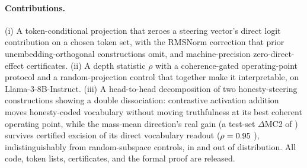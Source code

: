 \paragraph{Contributions.}
(i) A token-conditional projection that zeroes a steering vector's direct logit contribution on a chosen token set, with the RMSNorm correction that prior unembedding-orthogonal constructions omit, and machine-precision zero-direct-effect certificates. (ii) A depth statistic $\rho$ with a coherence-gated operating-point protocol and a random-projection control that together make it interpretable, on Llama-3-8B-Instruct. (iii) A head-to-head decomposition of two honesty-steering constructions showing a double dissociation: contrastive activation addition moves honesty-coded vocabulary without moving truthfulness at its best coherent operating point, while the mass-mean direction's real gain (a test-set $\Delta$MC2 of \MmTestDelta{} \MmTestDeltaCI) survives certified excision of its direct vocabulary readout ($\rho = 0.95$ \MmRhoAlSixtyFourCI), indistinguishably from random-subspace controls, in and out of distribution. All code, token lists, certificates, and the formal proof are released.
